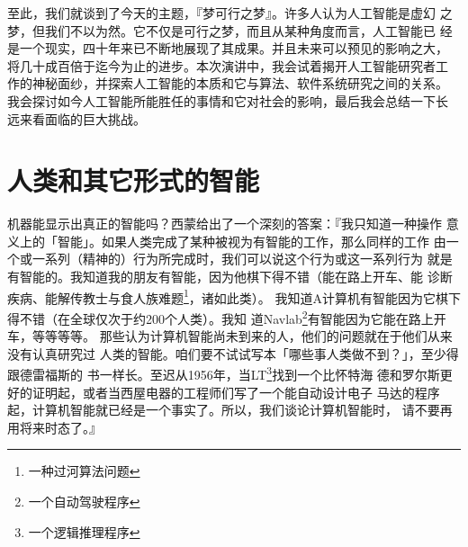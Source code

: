 \documentclass[12pt,a4paper]{article}
\begin{document}
至此，我们就谈到了今天的主题，『梦可行之梦』。许多人认为人工智能是虚幻
之梦，但我们不以为然。它不仅是可行之梦，而且从某种角度而言，人工智能已
经是一个现实，四十年来已不断地展现了其成果。并且未来可以预见的影响之大，
将几十成百倍于迄今为止的进步。本次演讲中，我会试着揭开人工智能研究者工
作的神秘面纱，并探索人工智能的本质和它与算法、软件系统研究之间的关系。
我会探讨如今人工智能所能胜任的事情和它对社会的影响，最后我会总结一下长
远来看面临的巨大挑战。

\section{人类和其它形式的智能}

机器能显示出真正的智能吗？西蒙给出了一个深刻的答案：『我只知道一种操作
意义上的「智能」。如果人类完成了某种被视为有智能的工作，那么同样的工作
由一个或一系列（精神的）行为所完成时，我们可以说这个行为或这一系列行为
就是有智能的。我知道我的朋友有智能，因为他棋下得不错（能在路上开车、能
诊断疾病、能解传教士与食人族难题\footnote{一种过河算法问题}，诸如此类）。
我知道A计算机有智能因为它棋下得不错（在全球仅次于约200个人类）。我知
道Navlab\footnote{一个自动驾驶程序}有智能因为它能在路上开车，等等等等。
那些认为计算机智能尚未到来的人，他们的问题就在于他们从来没有认真研究过
人类的智能。咱们要不试试写本「哪些事人类做不到？」，至少得跟德雷福斯的
书一样长。至迟从1956年，当LT\footnote{一个逻辑推理程序}找到一个比怀特海
德和罗尔斯更好的证明起，或者当西屋电器的工程师们写了一个能自动设计电子
马达的程序起，计算机智能就已经是一个事实了。所以，我们谈论计算机智能时，
请不要再用将来时态了。』
\end{document}
